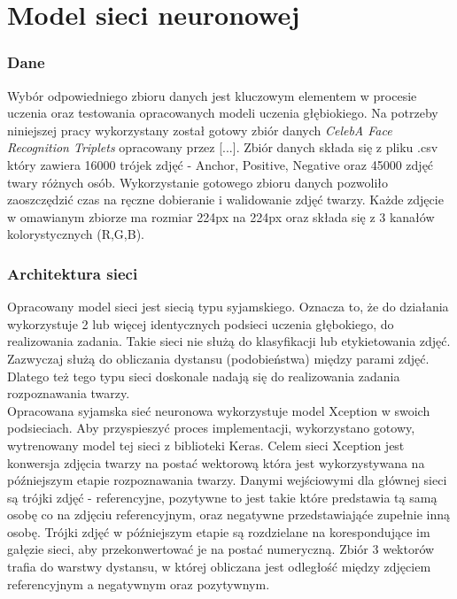 \section{Model sieci neuronowej}
\subsubsection{Dane}
Wybór odpowiedniego zbioru danych jest kluczowym elementem w procesie uczenia oraz testowania opracowanych modeli uczenia głębiokiego. Na potrzeby niniejszej pracy wykorzystany został gotowy zbiór danych \emph{CelebA Face Recognition Triplets} opracowany przez [...]. Zbiór danych składa się z pliku .csv który zawiera 16000 trójek zdjęć - Anchor, Positive, Negative oraz 45000 zdjęć twary różnych osób. Wykorzystanie gotowego zbioru danych pozwoliło zaoszczędzić czas na ręczne dobieranie i walidowanie zdjęć twarzy.
Każde zdjęcie w omawianym zbiorze ma rozmiar 224px na 224px oraz składa się z 3 kanałów kolorystycznych (R,G,B).
\subsubsection{Architektura sieci}
Opracowany model sieci jest siecią typu syjamskiego. Oznacza to, że do działania wykorzystuje 2 lub więcej identycznych podsieci uczenia głębokiego, do realizowania zadania. Takie sieci nie służą do klasyfikacji lub etykietowania zdjęć. Zazwyczaj służą do obliczania dystansu (podobieństwa) między parami zdjęć. Dlatego też tego typu sieci doskonale nadają się do realizowania zadania rozpoznawania twarzy. \\
Opracowana syjamska sieć neuronowa wykorzystuje model Xception w swoich podsieciach. Aby przyspieszyć proces implementacji, wykorzystano gotowy, wytrenowany model tej sieci z biblioteki Keras. Celem sieci Xception jest konwersja zdjęcia twarzy na postać wektorową która jest wykorzystywana na późniejszym etapie rozpoznawania twarzy.
Danymi wejściowymi dla głównej sieci są trójki zdjęć - referencyjne, pozytywne to jest takie które predstawia tą samą osobę co na zdjęciu referencyjnym, oraz negatywne przedstawiająće zupełnie inną osobę. Trójki zdjęć w późniejszym etapie są rozdzielane na korespondujące im gałęzie sieci, aby przekonwertować je na postać numeryczną. Zbiór 3 wektorów trafia do warstwy dystansu, w której obliczana jest odległość między zdjęciem referencyjnym a negatywnym oraz pozytywnym. 
